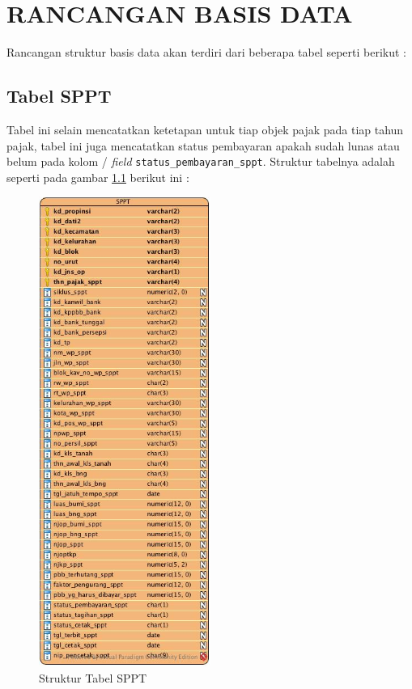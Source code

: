 \chapter{RANCANGAN BASIS DATA}

Rancangan struktur basis data akan terdiri dari beberapa tabel seperti berikut :

\section{Tabel SPPT}

Tabel ini selain mencatatkan ketetapan untuk tiap objek pajak pada tiap tahun pajak, tabel ini juga mencatatkan status pembayaran apakah sudah lunas atau belum pada kolom / \textit{field} \texttt{status\_pembayaran\_sppt}. Struktur tabelnya adalah seperti pada gambar \ref{fig:tab-sppt} berikut ini :

\begin{figure}[H]
	\centering
	\includegraphics[width=0.5\textwidth]{./resources/struktur-tabel-sppt}
	\caption{Struktur Tabel SPPT}
	\label{fig:tab-sppt}
\end{figure}

